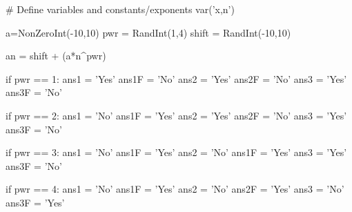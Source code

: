 



\begin{sagesilent}
# Define variables and constants/exponents
var('x,n')


a=NonZeroInt(-10,10)
pwr = RandInt(1,4)
shift = RandInt(-10,10)

an = shift + (a*n^pwr)



if pwr == 1:
   ans1 = 'Yes'
   ans1F = 'No'
   ans2 = 'Yes'
   ans2F = 'No'
   ans3 = 'Yes'
   ans3F = 'No'

if pwr == 2:
   ans1 = 'No'
   ans1F = 'Yes'
   ans2 = 'Yes'
   ans2F = 'No'
   ans3 = 'Yes'
   ans3F = 'No'

if pwr == 3:
   ans1 = 'No'
   ans1F = 'Yes'
   ans2 = 'No'
   ans1F = 'Yes'
   ans3 = 'Yes'
   ans3F = 'No'

if pwr == 4:
   ans1 = 'No'
   ans1F = 'Yes'
   ans2 = 'No'
   ans2F = 'Yes'
   ans3 = 'No'
   ans3F = 'Yes'

\end{sagesilent}

